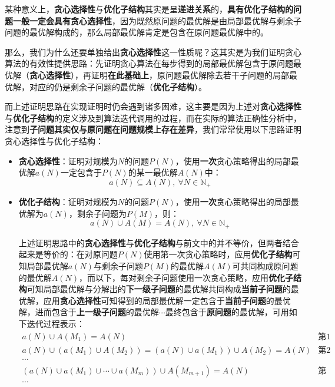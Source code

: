 \documentclass[12pt,a4paper,violet,oneside]{bbe}
\begin{document}
\begin{remark}
	某种意义上，\textbf{贪心选择性}与\textbf{优化子结构}其实是呈\textbf{递进关系}的，\textbf{具有优化子结构的问题一般一定会具有贪心选择性}，因为既然原问题的最优解是由局部最优解与剩余子问题的最优解构成的，那么局部最优解肯定是包含在原问题最优解中的。
	
	那么，我们为什么还要单独给出\textbf{贪心选择性}这一性质呢？这其实是为我们证明贪心算法的有效性提供思路：先证明贪心算法在每步得到的局部最优解包含于原问题最优解（\textbf{贪心选择性}），再证明\textbf{在此基础上}，原问题最优解除去若干子问题的局部最优解，对应的仍是剩余子问题的最优解（\textbf{优化子结构}）。
	
	而上述证明思路在实现证明时仍会遇到诸多困难，这主要是因为上述对\textbf{贪心选择性}与\textbf{优化子结构}的定义涉及到算法迭代调用的过程，而在实际的算法正确性分析中，注意到\textbf{子问题其实仅与原问题在问题规模上存在差异}，我们常常使用以下思路证明贪心选择性与优化子结构：
	\begin{itemize}
		\item \textbf{贪心选择性}：证明对规模为$N$的问题$P(N)$，使用\textbf{一次}贪心策略得出的局部最优解$a(N)$一定包含于$P(N)$的某一最优解$A(N)$中：
		$$
		a(N)\subseteq A(N),~\forall N\in\mathbb{N}_+
		$$
	\item \textbf{优化子结构}：证明对规模为$N$的问题$P(N)$，使用\textbf{一次}贪心策略得出的局部最优解为$a(N)$，剩余子问题为$P(M)$，则：
	$$
	a(N)\cup A(M)=A(N),~\forall N\in\mathbb{N}_+
	$$
	
	上述证明思路中的\textbf{贪心选择性}与\textbf{优化子结构}与前文中的并不等价，但两者结合起来是等价的：在对原问题$P(N)$使用第一次贪心策略时，应用\textbf{优化子结构}可知局部最优解$a(N)$与剩余子问题$P(M)$的最优解$A(M)$可共同构成原问题的最优解$A(N)$，而以下，每对剩余子问题使用一次贪心策略，应用\textbf{优化子结构}可知局部最优解与分解出的\textbf{下一级子问题}的最优解共同构成\textbf{当前子问题}的最优解，应用\textbf{贪心选择性}可知得到的局部最优解一定包含于\textbf{当前子问题}的最优解，进而包含于\textbf{上一级子问题}的最优解$\cdots$最终包含于\textbf{原问题}的最优解，可用如下迭代过程表示：
	$$
	\begin{array}{cl}
		a(N)\cup A(M_1)= A(N)&\text{第1次调用}\\
		a(N)\cup (a(M_1)\cup A(M_2))=(a(N)\cup a(M_1))\cup A(M_2)= A(N)&\text{第2次调用}\\
		\cdots&\\
		(a(N)\cup a(M_1)\cup\cdots \cup a(M_m))\cup A(M_{m+1})= A(N)&\text{第m+1次调用}\\
		\cdots&\\
	\end{array}
	$$
	\end{itemize}
\end{remark}
\end{document}

